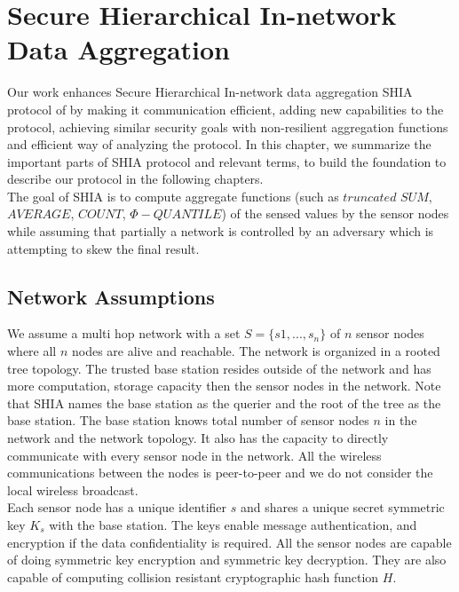 \chapter{Secure Hierarchical In-network Data Aggregation} %
\label{cha:Secure hierarchical In-network data aggregation}

Our work enhances Secure Hierarchical In-network data aggregation SHIA protocol of \cite{chan2006secure} by making it communication efficient, adding new capabilities to the protocol, achieving similar security goals with non-resilient aggregation functions and efficient way of analyzing the protocol.
In this chapter, we summarize the important parts of SHIA protocol and relevant terms, to build the foundation to describe our protocol in the following chapters.\\
The goal of SHIA is to compute aggregate functions (such as $\textit{truncated SUM}$, $\textit{AVERAGE}$, $\textit{COUNT}$, $\Phi-QUANTILE$) of the sensed values by the sensor nodes while assuming that partially a network is controlled by an adversary which is attempting to skew the final result.

\section{Network Assumptions}

	We assume a multi hop network with a set $ S = \{s1,...,s_{n}\} $ of $n$ sensor nodes where all $n$ nodes are alive and reachable. 
	The network is organized in a rooted tree topology.
	The trusted base station resides outside of the network and has more computation, storage capacity then the sensor nodes in the network. 
	Note that SHIA names the base station as the querier and the root of the tree as the base station. 
	The base station knows total number of sensor nodes $n$ in the network and the network topology. 
	It also has the capacity to directly communicate with every sensor node in the network.
	All the wireless communications between the nodes is peer-to-peer and we do not consider the local wireless broadcast.\\
	Each sensor node has a unique identifier $s$ and shares a unique secret symmetric key $K_{s}$ with the base station.
	The keys enable message authentication, and encryption if the data confidentiality is required.
	All the sensor nodes are capable of doing symmetric key encryption and symmetric key decryption.
	They are also capable of computing collision resistant cryptographic hash function $H$. 

